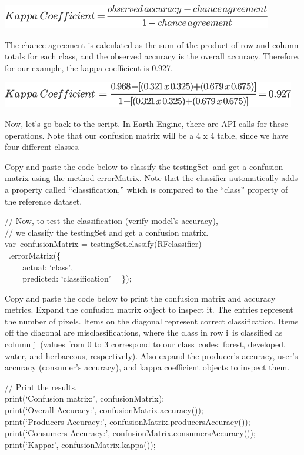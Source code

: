 \documentclass[
  letterpaper,
  DIV=11,
  numbers=noendperiod]{scrreprt}
\begin{document}
\includegraphics{./F2/image18.png}

The chance agreement is calculated as the sum of the product of row and
column totals for each class, and the observed accuracy is the overall
accuracy. Therefore, for our example, the kappa coefficient is 0.927.

\includegraphics{./F2/image19.png}

Now, let's go back to the script. In Earth Engine, there are API calls
for these operations. Note that our confusion matrix will be a 4 x 4
table, since we have four different classes.

Copy and paste the code below to classify the testingSet~and get a
confusion matrix using the method errorMatrix. Note that the classifier
automatically adds a property called ``classification,'' which is
compared to the ``class'' property of the reference dataset.

// Now, to test the classification (verify model's accuracy),\\
// we classify the testingSet and get a confusion matrix.\\
var~confusionMatrix = testingSet.classify(RFclassifier)\\
\hspace*{0.333em} ~.errorMatrix(\{\\
\hspace*{0.333em} ~ ~ ~actual: `class',\\
\hspace*{0.333em} ~ ~ ~predicted: `classification'~ ~\});

Copy and paste the code below to print the confusion matrix and accuracy
metrics. Expand the confusion matrix object to inspect it. The entries
represent the number of pixels. Items on the diagonal represent correct
classification. Items off the diagonal are misclassifications, where the
class in row i~is classified as column j~(values from 0 to 3 correspond
to our class~codes: forest, developed, water, and herbaceous,
respectively). Also expand the producer's accuracy, user's accuracy
(consumer's accuracy), and kappa coefficient objects to inspect them.

// Print the results.\\
print(`Confusion matrix:', confusionMatrix);\\
print(`Overall Accuracy:', confusionMatrix.accuracy());\\
print(`Producers Accuracy:', confusionMatrix.producersAccuracy());\\
print(`Consumers Accuracy:', confusionMatrix.consumersAccuracy());\\
print(`Kappa:', confusionMatrix.kappa());
\end{document}
